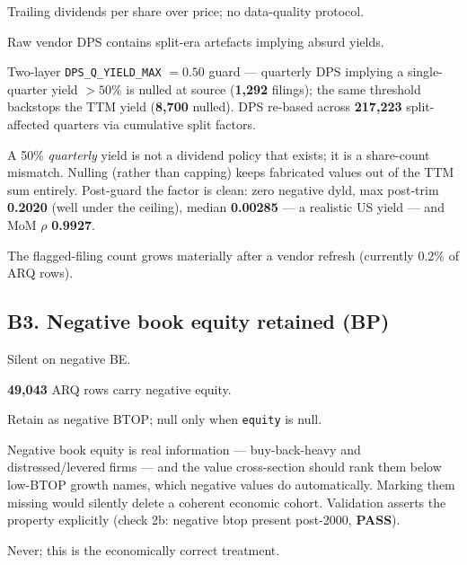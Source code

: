 \documentclass[11pt,a4paper]{article}
\newcommand{\PASS}[1]{\textcolor{pass}{\textbf{#1}}}
\begin{document}
\begin{description}[style=nextline]
  \item[USE4] Trailing dividends per share over price; no data-quality protocol.
  \item[Deviation] Raw vendor DPS contains split-era artefacts implying absurd
    yields.
  \item[Solution] Two-layer \texttt{DPS\_Q\_YIELD\_MAX} $=0.50$ guard ---
    quarterly DPS implying a single-quarter yield $>50\%$ is nulled at source
    (\textbf{1{,}292} filings); the same threshold backstops the TTM yield
    (\textbf{8{,}700} nulled). DPS re-based across \textbf{217{,}223}
    split-affected quarters via cumulative split factors.
  \item[Validity] A 50\% \emph{quarterly} yield is not a dividend policy that
    exists; it is a share-count mismatch. Nulling (rather than capping) keeps
    fabricated values out of the TTM sum entirely. Post-guard the factor is
    clean: zero negative dyld, max post-trim \textbf{0.2020} (well under the
    ceiling), median \textbf{0.00285} --- a realistic US yield --- and MoM
    $\rho$ \textbf{0.9927}.
  \item[Revisit when] The flagged-filing count grows materially after a vendor
    refresh (currently $0.2\%$ of ARQ rows).
\end{description}

\subsection{B3. Negative book equity retained (BP)}

\begin{description}[style=nextline]
  \item[USE4] Silent on negative BE.
  \item[Deviation] \textbf{49{,}043} ARQ rows carry negative equity.
  \item[Solution] Retain as negative BTOP; null only when \texttt{equity} is
    null.
  \item[Validity] Negative book equity is real information --- buy-back-heavy
    and distressed/levered firms --- and the value cross-section should rank
    them below low-BTOP growth names, which negative values do automatically.
    Marking them missing would silently delete a coherent economic cohort.
    Validation asserts the property explicitly (check 2b: negative btop present
    post-2000, \PASS{PASS}).
  \item[Revisit when] Never; this is the economically correct treatment.
\end{description}
\end{document}
